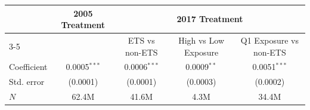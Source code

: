 \begin{tabular}{lcccc}
\toprule
 & 2005 Treatment & \multicolumn{3}{c}{2017 Treatment} \\
\cmidrule(lr){3-5}
 &  & ETS vs non-ETS & High vs Low Exposure & Q1 Exposure vs non-ETS \\
\midrule
Coefficient & 0.0005$^{***}$ & 0.0006$^{***}$ & 0.0009$^{**}$ & 0.0051$^{***}$ \\
Std. error & (0.0001) & (0.0001) & (0.0003) & (0.0002) \\
$N$ & 62.4M & 41.6M & 4.3M & 34.4M \\
\bottomrule
\end{tabular}
